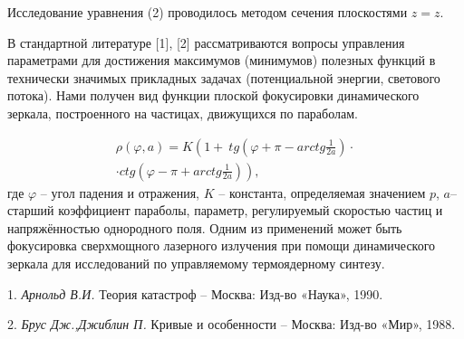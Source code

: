 Исследование уравнения (2) проводилось методом сечения плоскостями $z=z$.

В стандартной литературе [1], [2] рассматриваются вопросы управления параметрами для достижения максимумов (минимумов) полезных функций в технически значимых прикладных задачах (потенциальной энергии, светового потока). Нами получен вид функции плоской фокусировки динамического зеркала, построенного на частицах, движущихся по параболам.

\begin{multline*}
	\rho (\varphi ,a)=
	K\left(1+\ tg\left(\varphi +\pi -arctg\frac{1}{2a}\right)\cdot
	\right.\\ \cdot \left.
	 ctg\left(\varphi -\pi +arctg\frac{1}{2a}\right)\right),
\end{multline*}
где  $\varphi $ -- угол падения и отражения, $K$ -- константа, определяемая значением $p$, $a$-- старший коэффициент параболы, параметр, регулируемый скоростью частиц и напряжённостью  однородного поля. Одним из применений может быть фокусировка сверхмощного лазерного излучения при помощи динамического зеркала для исследований по управляемому термоядерному синтезу.



\litlist

1. {\it Арнольд В.И.} Теория катастроф -- Москва: Изд-во «Наука», 1990.

2. {\it Брус Дж.,Джиблин П.} Кривые и особенности -- Москва: Изд-во «Мир», 1988.


